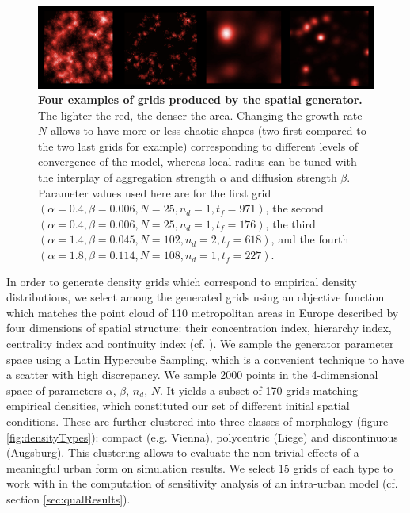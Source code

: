 \documentclass{JASSS}
\begin{document}
\begin{figure}[!t]
\centering
	\includegraphics[width=\textwidth]{figures/Fig2.png}
 \caption{\textbf{Four examples of grids produced by the spatial generator.} The lighter the red, the denser the area. Changing the growth rate $N$ allows to have more or less chaotic shapes (two first compared to the two last grids for example) corresponding to different levels of convergence of the model, whereas local radius can be tuned with the interplay of aggregation strength $\alpha$ and diffusion strength $\beta$. Parameter values used here are for the first grid $(\alpha = 0.4,\beta=0.006, N = 25, n_d = 1, t_f = 971)$, the second $(\alpha = 0.4,\beta=0.006, N = 25, n_d = 1, t_f = 176)$, the third $(\alpha = 1.4,\beta=0.045, N = 102, n_d = 2, t_f = 618)$, and the fourth $(\alpha = 1.8,\beta=0.114, N = 108, n_d = 1, t_f = 227)$.}
\label{fig:spatialGen}
\end{figure} %



In order to generate density grids which correspond to empirical density distributions, we select among the generated grids using an objective function which matches the point cloud of 110 metropolitan areas in Europe described by four dimensions of spatial structure: their concentration index, hierarchy index, centrality index and continuity index (cf. \cite{LeNechet2015}). We sample the generator parameter space using a Latin Hypercube Sampling, which is a convenient technique to have a scatter with high discrepancy. We sample 2000 points in the 4-dimensional space of parameters {$\alpha$, $\beta$, $n_d$, $N$}. It yields a subset of 170 grids matching empirical densities, which constituted our set of different initial spatial conditions. These are further clustered into three classes of morphology (figure \ref{fig:densityTypes}): compact (e.g. Vienna), polycentric (Liege) and discontinuous (Augsburg). This clustering allows to evaluate the non-trivial effects of a meaningful urban form on simulation results. We select 15 grids of each type to work with in the computation of sensitivity analysis of an intra-urban model (cf. section \ref{sec:qualResults}).
\end{document}
